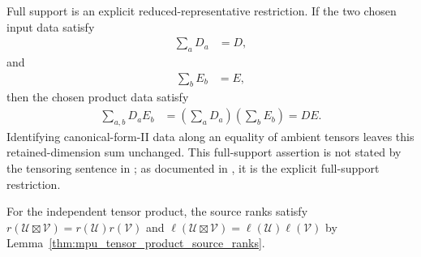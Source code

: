 \begin{lemma}
    Full support is an explicit reduced-representative restriction. If the two
    chosen input data satisfy
    \begin{align}
        \sum_a D_a & =D,
    \end{align}
    and
    \begin{align}
        \sum_b E_b & =E,
    \end{align}
    then the chosen product data satisfy
    \begin{align}
        \sum_{a,b}D_aE_b
         & =\left(\sum_aD_a\right)\left(\sum_bE_b\right)
        =DE.
    \end{align}
    Identifying canonical-form-II data along an equality of ambient tensors
    leaves this retained-dimension sum unchanged. This full-support assertion
    is not stated by the tensoring sentence in
    \cite[Theorem~IV.6(ii)]{Cirac2017MPU}; as documented in \cite{gap:mpu_canonical_form_full_support}, it is the explicit
    full-support restriction.

    For the independent tensor product, the source ranks satisfy
    $r(\mathcal U\boxtimes\mathcal V)=r(\mathcal U)r(\mathcal V)$ and
    $\ell(\mathcal U\boxtimes\mathcal V)=\ell(\mathcal U)\ell(\mathcal V)$ by
    Lemma~\ref{thm:mpu_tensor_product_source_ranks}.
\end{lemma}

